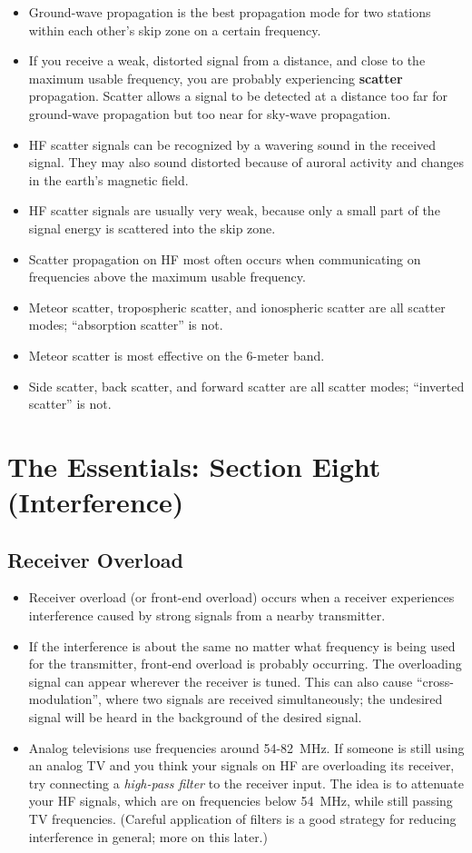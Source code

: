 \documentclass[letterpaper,12pt]{scrartcl}
\begin{document}
\begin{itemize}
\item Ground-wave propagation is the best propagation mode for two stations within each other's skip zone on a certain frequency.
\item If you receive a weak, distorted signal from a distance, and close to the maximum usable frequency, you are probably experiencing \textbf{scatter} propagation.
  Scatter allows a signal to be detected at a distance too far for ground-wave propagation but too near for sky-wave propagation.
\item HF scatter signals can be recognized by a wavering sound in the received signal. They may also sound distorted because of auroral activity and changes in the earth's magnetic field.
\item HF scatter signals are usually very weak, because only a small part of the signal energy is scattered into the skip zone.
\item Scatter propagation on HF most often occurs when communicating on frequencies above the maximum usable frequency.
\item Meteor scatter, tropospheric scatter, and ionospheric scatter are all scatter modes; ``absorption scatter'' is not.
\item Meteor scatter is most effective on the 6-meter band.
\item Side scatter, back scatter, and forward scatter are all scatter modes; ``inverted scatter'' is not.
\end{itemize}

\section{The Essentials: Section Eight (Interference)}

\subsection{Receiver Overload}

\begin{itemize}
\item Receiver overload (or front-end overload) occurs when a receiver experiences interference caused by strong signals from a nearby transmitter.
\item If the interference is about the same no matter what frequency is being used for the transmitter, front-end overload is probably occurring.
  The overloading signal can appear wherever the receiver is tuned. This can also cause ``cross-modulation'', where two signals are received simultaneously;
  the undesired signal will be heard in the background of the desired signal.
\item Analog televisions use frequencies around 54-82~MHz. If someone is still using an analog TV and you think your signals on HF are overloading its receiver,
  try connecting a \textit{high-pass filter} to the receiver input. The idea is to attenuate your HF signals, which are on frequencies below 54~MHz,
  while still passing TV frequencies. (Careful application of filters is a good strategy for reducing interference in general; more on this later.)
\end{itemize}
\end{document}
